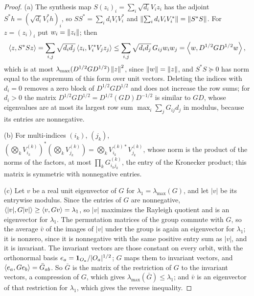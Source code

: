 \begin{proof}
(a) The synthesis map $S(z_i)_i=\sum_i\sqrt{d_i}V_iz_i$ has the adjoint
$S^*h=(\sqrt{d_i}V_i^*h)_i$, so $SS^*=\sum_id_iV_iV_i^*$ and
$\left\|\sum_id_iV_iV_i^*\right\|=\left\|S^*S\right\|$. For $z=(z_i)_i$ put $w_i=\left\|z_i\right\|$; then
\[
  \left\langle z,S^*Sz\right\rangle=\sum_{i,j}\sqrt{d_id_j}\left\langle z_i,V_i^*V_jz_j\right\rangle
  \le\sum_{i,j}\sqrt{d_id_j}\,G_{ij}w_iw_j=\left\langle w,D^{1/2}GD^{1/2}w\right\rangle,
\]
which is at most $\lambda_{\max}(D^{1/2}GD^{1/2})\left\|z\right\|^2$,
since $\left\|w\right\|=\left\|z\right\|$, and $S^*S\succeq0$ has norm equal to the supremum of
this form over unit vectors. Deleting the indices with $d_i=0$ removes a zero
block of $D^{1/2}GD^{1/2}$ and does not increase the row sums; for $d_i>0$ the
matrix $D^{1/2}GD^{1/2}=D^{1/2}(GD)D^{-1/2}$ is similar to $GD$, whose
eigenvalues are at most its largest row sum $\max_i\sum_jG_{ij}d_j$ in modulus,
because its entries are nonnegative.

(b) For multi-indices $(i_k)$, $(j_k)$,
$(\bigotimes_kV^{(k)}_{i_k})^*(\bigotimes_kV^{(k)}_{j_k})=\bigotimes_kV^{(k)*}_{i_k}V^{(k)}_{j_k}$,
whose norm is the product of the norms of the factors, at most
$\prod_kG^{(k)}_{i_kj_k}$, the entry of the Kronecker product; this matrix is
symmetric with nonnegative entries.

(c) Let $v$ be a real unit eigenvector of $G$ for $\lambda_1=\lambda_{\max}(G)$,
and let $|v|$ be its entrywise modulus. Since the entries of $G$ are
nonnegative, $\left\langle |v|,G|v|\right\rangle\ge\left\langle v,Gv\right\rangle=\lambda_1$, so $|v|$ maximizes the
Rayleigh quotient and is an eigenvector for $\lambda_1$. The permutation
matrices of the group commute with $G$, so the average $\bar v$ of the images
of $|v|$ under the group is again an eigenvector for $\lambda_1$; it is
nonzero, since it is nonnegative with the same positive entry sum as $|v|$,
and it is invariant. The invariant vectors are those constant on every orbit,
with the orthonormal basis $e_a=\mathbf 1_{O_a}/|O_a|^{1/2}$; $G$ maps them to
invariant vectors, and $\left\langle e_a,Ge_b\right\rangle=\bar G_{ab}$. So $\bar G$ is the matrix
of the restriction of $G$ to the invariant vectors, a compression of $G$, which
gives $\lambda_{\max}(\bar G)\le\lambda_1$; and $\bar v$ is an eigenvector of
that restriction for $\lambda_1$, which gives the reverse inequality.
\end{proof}

